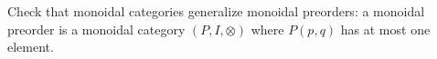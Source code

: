 Check that monoidal categories generalize monoidal preorders: a monoidal preorder is a monoidal category $(P,I,\otimes)$ where $P(p,q)$ has at most one element.